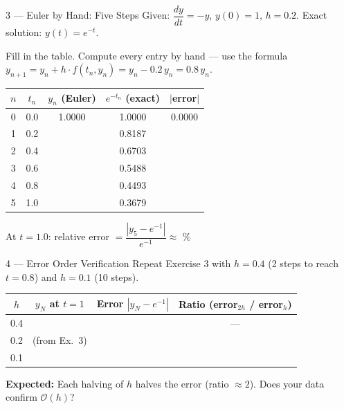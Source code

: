 \documentclass[12pt, a4paper]{article}
\begin{document}
\begin{exercisebox}{3 — Euler by Hand: Five Steps}
Given: $\dfrac{dy}{dt} = -y$, \; $y(0)=1$, \; $h=0.2$.
\quad Exact solution: $y(t) = e^{-t}$.

Fill in the table. Compute every entry by hand — use the formula
$y_{n+1} = y_n + h\cdot f(t_n, y_n) = y_n - 0.2\,y_n = 0.8\,y_n$.

\begin{center}
\begin{tabular}{|c|c|c|c|c|}
\hline
$n$ & $t_n$ & $y_n$ (Euler) & $e^{-t_n}$ (exact) & $|$error$|$ \\
\hline
0 & 0.0 & 1.0000\phantom{000} & 1.0000\phantom{000} & 0.0000 \\
\hline
1 & 0.2 & & 0.8187 & \\
\hline
2 & 0.4 & & 0.6703 & \\
\hline
3 & 0.6 & & 0.5488 & \\
\hline
4 & 0.8 & & 0.4493 & \\
\hline
5 & 1.0 & & 0.3679 & \\
\hline
\end{tabular}
\end{center}

At $t=1.0$: relative error $= \dfrac{|y_5 - e^{-1}|}{e^{-1}} \approx $ \underline{\hspace{2cm}} \%
\end{exercisebox}

\begin{solutionspace}[5cm]
\end{solutionspace}

\begin{exercisebox}{4 — Error Order Verification}
Repeat Exercise 3 with $h=0.4$ (2 steps to reach $t=0.8$) and $h=0.1$ (10 steps).

\begin{center}
\begin{tabular}{|c|c|c|c|}
\hline
$h$ & $y_N$ at $t=1$ & Error $|y_N - e^{-1}|$ & Ratio (error$_{2h}$ / error$_h$) \\
\hline
0.4  & & & — \\
\hline
0.2  & (from Ex.~3) & & \\
\hline
0.1  & & & \\
\hline
\end{tabular}
\end{center}

\textbf{Expected:} Each halving of $h$ halves the error (ratio $\approx 2$). Does your data confirm $\mathcal{O}(h)$?
\end{exercisebox}
\end{document}
